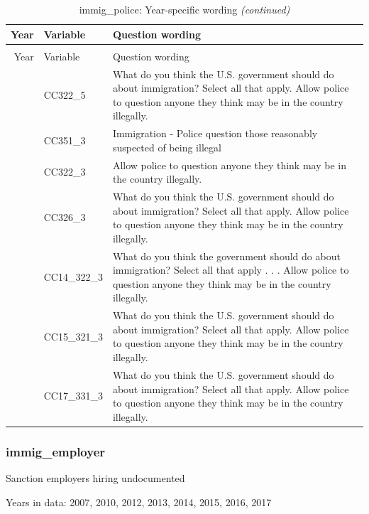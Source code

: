 \documentclass[
  12pt]{article}
\begin{document}
\begin{longtable}[t]{rl>{\raggedright\arraybackslash}p{10cm}}
\caption{\label{tab:unnamed-chunk-5}immig\_police: Year-specific wording}\\
\toprule
Year & Variable & Question wording\\
\midrule
\endfirsthead
\caption[]{immig\_police: Year-specific wording \textit{(continued)}}\\
\toprule
Year & Variable & Question wording\\
\midrule
\endhead

\endfoot
\bottomrule
\endlastfoot
2010 & CC322\_5 & What do you think the U.S. government should do about immigration? Select all that apply. Allow police to question anyone they think may be in the country illegally.\\
\addlinespace
2011 & CC351\_3 & Immigration - Police question those reasonably suspected of being illegal\\
\addlinespace
2012 & CC322\_3 & Allow police to question anyone they think may be in the country illegally.\\
\addlinespace
2013 & CC326\_3 & What do you think the U.S. government should do about immigration? Select all that apply. Allow police to question anyone they think may be in the country illegally.\\
\addlinespace
2014 & CC14\_322\_3 & What do you think the government should do about immigration? Select all that apply . . . Allow police to question anyone they think may be in the country illegally.\\
\addlinespace
2015 & CC15\_321\_3 & What do you think the U.S. government should do about immigration? Select all that apply. Allow police to question anyone they think may be in the country illegally.\\
\addlinespace
2017 & CC17\_331\_3 & What do you think the U.S. government should do about immigration? Select all that apply. Allow police to question anyone they think may be in the country illegally.\\*
\end{longtable}
\endgroup{}

\hypertarget{immig_employer}{%
\subsubsection{immig\_employer}\label{immig_employer}}

Sanction employers hiring undocumented

Years in data: 2007, 2010, 2012, 2013, 2014, 2015, 2016,
2017\begingroup\fontsize{10}{12}\selectfont
\end{document}
